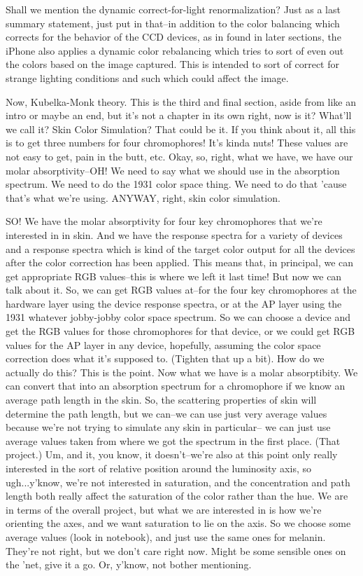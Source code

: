 Shall we mention the dynamic correct-for-light renormalization? Just as a last summary statement, just put in that--in addition to the color balancing which corrects for the behavior of the CCD devices, as in found in later sections, the iPhone also applies a dynamic color rebalancing which tries to sort of even out the colors based on the image captured. This is intended to sort of correct for strange lighting conditions and such which could affect the image.



Now, Kubelka-Monk theory. This is the third and final section, aside from like an intro or maybe an end, but it's not a chapter in its own right, now is it? What'll we call it? Skin Color Simulation? That could be it. If you think about it, all this is to get three numbers for four chromophores! It's kinda nuts! These values are not easy to get, pain in the butt, etc. Okay, so, right, what we have, we have our molar absorptivity--OH! We need to say what we should use in the absorption spectrum. We need to do the 1931 color space thing. We need to do that 'cause that's what we're using. ANYWAY, right, skin color simulation. 

SO! We have the molar absorptivity for four key chromophores that we're interested in in skin. And we have the response spectra for a variety of devices and a response spectra which is kind of the target color output for all the devices after the color correction has been applied. This means that, in principal, we can get appropriate RGB values--this is where we left it last time! But now we can talk about it. So, we can get RGB values at--for the four key chromophores at the hardware layer using the device response spectra, or at the AP layer using the 1931 whatever jobby-jobby color space spectrum. So we can choose a device and get the RGB values for those chromophores for that device, or we could get RGB values for the AP layer in any device, hopefully, assuming the color space correction does what it's supposed to. (Tighten that up a bit). How do we actually do this? This is the point. Now what we have is a molar absorptibity. We can convert that into an absorption spectrum for a chromophore if we know an average path length in the skin. So, the scattering properties of skin will determine the path length, but we can--we can use just very average values because we're not trying to simulate any skin in particular-- we can just use average values taken from where we got the spectrum in the first place. (That project.) Um, and it, you know, it doesn't--we're also at this point only really interested in the sort of relative position around the luminosity axis, so ugh...y'know, we're not interested in saturation, and the concentration and path length both really affect the saturation of the color rather than the hue. We are in terms of the overall project, but what we are interested in is how we're orienting the axes, and we want saturation to lie on the axis. So we choose some average values (look in notebook), and just use the same ones for melanin. They're not right, but we don't care right now. Might be some sensible ones on the 'net, give it a go. Or, y'know, not bother mentioning.

